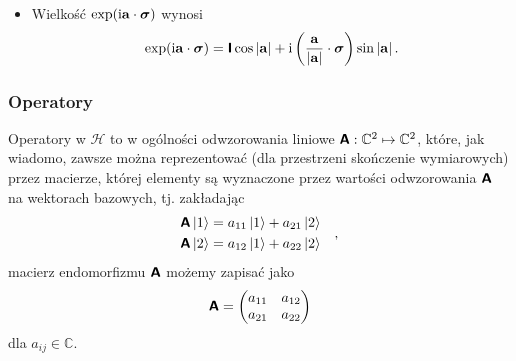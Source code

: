 \documentclass{myclass}
\begin{document}
\begin{itemize}
    \item Wielkość \(\exp(\mathrm{i}\mathbf{a}\cdot\boldsymbol{\sigma})\) wynosi
    \begin{equation*}
            \exp(\mathrm{i}\mathbf{a}\cdot\boldsymbol{\sigma}) = \boldsymbol{\mathsf{I}} \cos{|\mathbf{a}|} + \mathrm{i}\left(\frac{\mathbf{a}}{|\mathbf{a}|}\cdot\boldsymbol{\sigma}\right)\sin{|\mathbf{a}|}\,.
    \end{equation*}

\end{itemize}

\subsubsection{Operatory}

Operatory w \(\mathscr{H}\) to w ogólności odwzorowania liniowe
\(\boldsymbol{\mathsf{A}}:\mathbb{C}^2\mapsto\mathbb{C}^2\), które, jak wiadomo, zawsze można reprezentować (dla
przestrzeni skończenie wymiarowych) przez macierze, której elementy są wyznaczone przez wartości
odwzorowania \(\boldsymbol{\mathsf{A}}\) na wektorach bazowych, tj. zakładając
\begin{equation*}
    \begin{split}
        \boldsymbol{\mathsf{A}}\ket{1} = a_{11}\ket{1} + a_{21}\ket{2}\\
        \boldsymbol{\mathsf{A}}\ket{2} = a_{12}\ket{1} + a_{22}\ket{2}
    \end{split}\quad,
\end{equation*}
macierz endomorfizmu \(\boldsymbol{\mathsf{A}}\) możemy zapisać jako
\begin{equation*}
    \oper{A} = \mqty(a_{11} & a_{12} \\ a_{21} & a_{22})
\end{equation*}
dla \(a_{ij} \in \mathbb{C}\).
\end{document}
